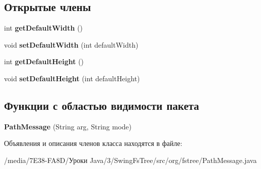 \subsection*{Открытые члены}
\begin{DoxyCompactItemize}
\item 
\hypertarget{classorg_1_1fstree_1_1_path_message_aa56120b0ab091b5f899f2c03212da911}{
int {\bfseries getDefaultWidth} ()}
\label{classorg_1_1fstree_1_1_path_message_aa56120b0ab091b5f899f2c03212da911}

\item 
\hypertarget{classorg_1_1fstree_1_1_path_message_a3c7e45bf920d084867a11e5e1544cfbb}{
void {\bfseries setDefaultWidth} (int defaultWidth)}
\label{classorg_1_1fstree_1_1_path_message_a3c7e45bf920d084867a11e5e1544cfbb}

\item 
\hypertarget{classorg_1_1fstree_1_1_path_message_a8cb5c06c892efec9b65eaca9c1285f07}{
int {\bfseries getDefaultHeight} ()}
\label{classorg_1_1fstree_1_1_path_message_a8cb5c06c892efec9b65eaca9c1285f07}

\item 
\hypertarget{classorg_1_1fstree_1_1_path_message_a1ebbb6a26be0539db4edf26889870588}{
void {\bfseries setDefaultHeight} (int defaultHeight)}
\label{classorg_1_1fstree_1_1_path_message_a1ebbb6a26be0539db4edf26889870588}

\end{DoxyCompactItemize}
\subsection*{Функции с областью видимости пакета}
\begin{DoxyCompactItemize}
\item 
\hypertarget{classorg_1_1fstree_1_1_path_message_aad91c18167072f6f991089ed2d0e8eda}{
{\bfseries PathMessage} (String arg, String mode)}
\label{classorg_1_1fstree_1_1_path_message_aad91c18167072f6f991089ed2d0e8eda}

\end{DoxyCompactItemize}


Объявления и описания членов класса находятся в файле:\begin{DoxyCompactItemize}
\item 
/media/7E38-\/FA8D/Уроки Java/3/SwingFsTree/src/org/fstree/PathMessage.java\end{DoxyCompactItemize}
